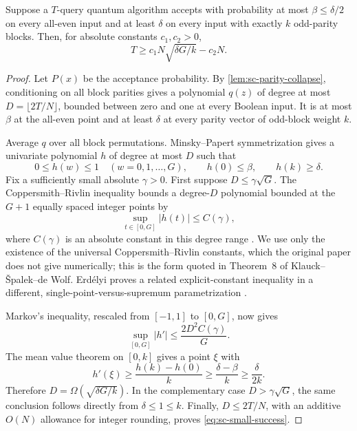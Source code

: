 \begin{theorem}
\label{thm:sc-small-success}
Suppose a $T$-query quantum algorithm accepts with probability at most
$\beta\le\delta/2$ on every all-even input and at least $\delta$ on every
input with exactly $k$ odd-parity blocks.  Then, for absolute constants
$c_1,c_2>0$,
\begin{equation}
 T\ge c_1N\sqrt{\delta G/k}-c_2N.
 \label{eq:sc-small-success}
\end{equation}
\end{theorem}

\begin{proof}
Let $P(x)$ be the acceptance probability.  By
\cref{lem:sc-parity-collapse}, conditioning on all block parities gives a
polynomial $q(z)$ of degree at most
$D=\lfloor2T/N\rfloor$, bounded between zero and one at every Boolean
input.  It is at most $\beta$ at the all-even point and at least $\delta$
at every parity vector of odd-block weight $k$.

Average $q$ over all block permutations.  Minsky--Papert symmetrization
\cite{minsky1988-perceptrons} gives a univariate polynomial $h$ of degree at
most $D$ such that
\[
 0\le h(w)\le1\quad(w=0,1,\ldots,G),\qquad
 h(0)\le\beta,\qquad h(k)\ge\delta.
\]
Fix a sufficiently small absolute $\gamma>0$.  First suppose
$D\le\gamma\sqrt G$.  The Coppersmith--Rivlin inequality bounds a
degree-$D$ polynomial bounded at the $G+1$ equally spaced integer points by
\[
 \sup_{t\in[0,G]}|h(t)|\le C(\gamma),
\]
where $C(\gamma)$ is an absolute constant in this degree range
\cite{coppersmith1992-growth-polynomials,klauck2007-quantum-classical-sdpt}.
We use only the existence of the universal Coppersmith--Rivlin constants,
which the original paper does not give numerically; this is the form quoted
in Theorem~8 of Klauck--\v Spalek--de Wolf.  Erd\'elyi proves a related
explicit-constant inequality in a different, single-point-versus-supremum
parametrization
\cite{erdelyi2016-coppersmith-rivlin}.

Markov's inequality, rescaled from $[-1,1]$ to $[0,G]$, now gives
\[
 \sup_{[0,G]}|h'|\le\frac{2D^2C(\gamma)}G.
\]
The mean value theorem on $[0,k]$ gives a point $\xi$ with
\[
 h'(\xi)\ge\frac{h(k)-h(0)}k
 \ge\frac{\delta-\beta}k\ge\frac{\delta}{2k}.
\]
Therefore $D=\Omega(\sqrt{\delta G/k})$.  In the complementary case
$D>\gamma\sqrt G$, the same conclusion follows directly from
$\delta\le1\le k$.  Finally, $D\le2T/N$, with an additive $O(N)$ allowance for integer
rounding, proves
\eqref{eq:sc-small-success}.
\end{proof}

